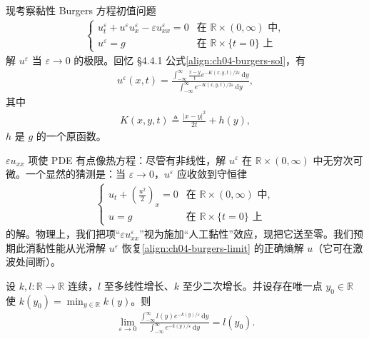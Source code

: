 \documentclass[../../main.tex]{subfiles}
\begin{document}
\begin{example}\label{example:ch04-burgers-vanishing}现考察黏性 Burgers 方程初值问题
\begin{align}\label{align:ch04-burgers-visc2}
\begin{cases}
u_t^\varepsilon+u^\varepsilon u_x^\varepsilon-\varepsilon u_{xx}^\varepsilon=0 & \text{在 }\mathbb{R}\times(0,\infty)\text{ 中},\\
u^\varepsilon=g & \text{在 }\mathbb{R}\times\{t=0\}\text{ 上}
\end{cases}
\end{align}
解 $u^\varepsilon$ 当 $\varepsilon\to 0$ 的极限。回忆 \S4.4.1 公式\eqref{align:ch04-burgers-sol}，有
\begin{align}\label{align:ch04-burgers-sol2}
u^\varepsilon(x,t)=\frac{\displaystyle\int_{-\infty}^\infty\frac{x-y}{t}e^{-K(x,y,t)/2\varepsilon}\,\mathrm{d}y}{\displaystyle\int_{-\infty}^\infty e^{-K(x,y,t)/2\varepsilon}\,\mathrm{d}y},
\end{align}
其中
\begin{align}\label{align:ch04-k-def}
K(x,y,t)\triangleq\frac{|x-y|^2}{2t}+h(y),
\end{align}
$h$ 是 $g$ 的一个原函数。

\textbf{$\varepsilon u_{xx}$} 项使 PDE 有点像热方程：尽管有非线性，解 $u^\varepsilon$ 在 $\mathbb{R}\times(0,\infty)$ 中无穷次可微。一个显然的猜测是：当 $\varepsilon\to 0$，$u^\varepsilon$ 应收敛到守恒律
\begin{align}\label{align:ch04-burgers-limit}
\begin{cases}
u_t+\left(\frac{u^2}{2}\right)_x=0 & \text{在 }\mathbb{R}\times(0,\infty)\text{ 中},\\
u=g & \text{在 }\mathbb{R}\times\{t=0\}\text{ 上}
\end{cases}
\end{align}
的解。物理上，我们把项``$\varepsilon u_{xx}^\varepsilon$''视为施加``人工黏性''效应，现把它送至零。我们预期此消黏性能从光滑解 $u^\varepsilon$ 恢复\eqref{align:ch04-burgers-limit} 的正确熵解 $u$（它可在激波处间断）。
\end{example}

\begin{lemma}[渐近]\label{lemma:ch04-laplace-asymptotic}设 $k,l:\mathbb{R}\to\mathbb{R}$ 连续，$l$ 至多线性增长、$k$ 至少二次增长。并设存在唯一点 $y_0\in\mathbb{R}$ 使 $k(y_0)=\min_{y\in\mathbb{R}}k(y)$。则
\begin{align}\label{align:ch04-laplace-lemma}
\lim_{\varepsilon\to 0}\frac{\displaystyle\int_{-\infty}^\infty l(y)e^{-k(y)/\varepsilon}\,\mathrm{d}y}{\displaystyle\int_{-\infty}^\infty e^{-k(y)/\varepsilon}\,\mathrm{d}y}=l(y_0).
\end{align}
\end{lemma}
\end{document}
